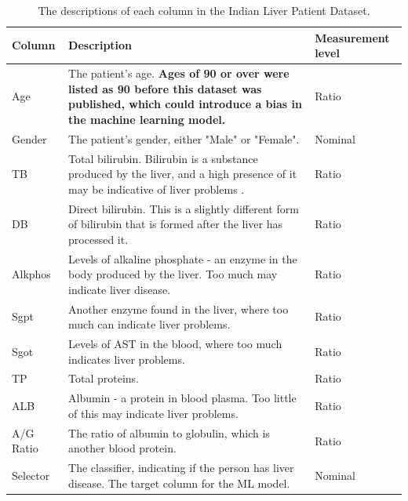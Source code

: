 \documentclass[12pt]{report}
\begin{document}
\begin{table}[H]
    \centering
        \begin{tabular}{ |p{}| p{}| p{}|}
            \hline
            \cellcolor{blue!25}Column & \cellcolor{blue!25}Description & \cellcolor{blue!25}Measurement level\\
            \hline
            Age & The patient's age. \textbf{Ages of 90 or over were listed as 90 before this dataset was published,
            which could introduce a bias in the machine learning model.} 
            & Ratio\\
            \hline
            Gender & The patient's gender, either "Male" or "Female". & Nominal\\
            \hline
            TB & Total bilirubin. Bilirubin is a substance produced by the liver, and a high presence of it may be indicative of
            liver problems \autocite{mayo_clinic_bilirubin_nodate}. & Ratio\\
            \hline
            DB & Direct bilirubin. This is a slightly different form of bilirubin that is formed after the liver has processed it.
            & Ratio\\
            \hline
            Alkphos & Levels of alkaline phosphate - an enzyme in the body produced by the liver. Too much may indicate liver disease. \autocite{clevelandclinic_alkaline_nodate}
            & Ratio\\
            \hline
            Sgpt & Another enzyme found in the liver, where too much can indicate liver problems.
            & Ratio\\
            \hline
            Sgot & Levels of AST in the blood, where too much indicates liver problems.
            & Ratio\\
            \hline
            TP & Total proteins.
            & Ratio\\
            \hline
            ALB & Albumin - a protein in blood plasma. Too little of this may indicate liver problems.
            & Ratio\\
            \hline
            A/G Ratio & The ratio of albumin to globulin, which is another blood protein.
            & Ratio %
            \\
            \hline
            Selector & The classifier, indicating if the person has liver disease. The target column for the ML model.
            & Nominal\\
            \hline
    \end{tabular}
    \caption{The descriptions of each column in the Indian Liver Patient Dataset.}\label{tab:ILPD-Types}
\end{table}
\end{document}

